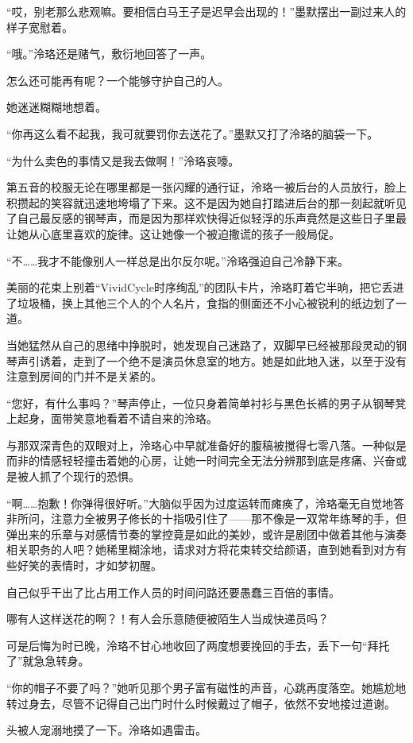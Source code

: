 \documentclass[UTF8, scheme = chinese, openany]{ctexbook}
\begin{document}
“哎，别老那么悲观嘛。要相信白马王子是迟早会出现的！”墨默摆出一副过来人的样子宽慰着。

“哦。”泠珞还是赌气，敷衍地回答了一声。

怎么还可能再有呢？一个能够守护自己的人。

她迷迷糊糊地想着。

“你再这么看不起我，我可就要罚你去送花了。”墨默又打了泠珞的脑袋一下。

“为什么卖色的事情又是我去做啊！”泠珞哀嚎。

第五音的校服无论在哪里都是一张闪耀的通行证，泠珞一被后台的人员放行，脸上积攒起的笑容就迅速地垮塌了下来。这不是因为她自打踏进后台的那一刻起就听见了自己最反感的钢琴声，而是因为那样欢快得近似轻浮的乐声竟然是这些日子里最让她从心底里喜欢的旋律。这让她像一个被迫撒谎的孩子一般局促。

“不……我才不能像别人一样总是出尔反尔呢。”泠珞强迫自己冷静下来。

美丽的花束上别着“VividCycle时序绚乱”的团队卡片，泠珞盯着它半晌，把它丢进了垃圾桶，换上其他三个人的个人名片，食指的侧面还不小心被锐利的纸边划了一道。

当她猛然从自己的思绪中挣脱时，她发现自己迷路了，双脚早已经被那段灵动的钢琴声引诱着，走到了一个绝不是演员休息室的地方。她是如此地入迷，以至于没有注意到房间的门并不是关紧的。

“您好，有什么事吗？”琴声停止，一位只身着简单衬衫与黑色长裤的男子从钢琴凳上起身，面带笑意地看着不请自来的泠珞。

与那双深青色的双眼对上，泠珞心中早就准备好的腹稿被搅得七零八落。一种似是而非的情感轻轻撞击着她的心房，让她一时间完全无法分辨那到底是疼痛、兴奋或是被人抓了个现行的恐惧。

“啊……抱歉！你弹得很好听。”大脑似乎因为过度运转而瘫痪了，泠珞毫无自觉地答非所问，注意力全被男子修长的十指吸引住了——那不像是一双常年练琴的手，但弹出来的乐章与对感情节奏的掌控竟是如此的美妙，或许是剧团中做着其他与演奏相关职务的人吧？她稀里糊涂地，请求对方将花束转交给颜语，直到她看到对方有些好笑的表情时，才如梦初醒。

自己似乎干出了比占用工作人员的时间问路还要愚蠢三百倍的事情。

哪有人这样送花的啊？！有人会乐意随便被陌生人当成快递员吗？

可是后悔为时已晚，泠珞不甘心地收回了两度想要挽回的手去，丢下一句“拜托了”就急急转身。

“你的帽子不要了吗？”她听见那个男子富有磁性的声音，心跳再度落空。她尴尬地转过身去，尽管不记得自己出门时什么时候戴过了帽子，依然不安地接过道谢。

头被人宠溺地摸了一下。泠珞如遇雷击。
\end{document}
